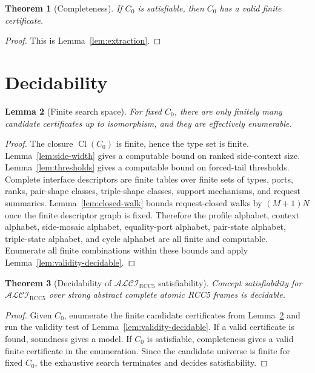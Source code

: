 \documentclass[11pt]{article}
\newtheorem{theorem}{Theorem}[section]
\newtheorem{lemma}[theorem]{Lemma}
\newcommand{\Logic}{\mathcal{ALCI}_{\mathrm{RCC5}}}
\newcommand{\Cl}{\operatorname{Cl}}
\begin{document}
\begin{theorem}[Completeness]
If $C_0$ is satisfiable, then $C_0$ has a valid finite certificate.
\end{theorem}

\begin{proof}
This is Lemma~\ref{lem:extraction}.
\end{proof}


\section{Decidability}

\begin{lemma}[Finite search space]\label{lem:finite-universe}
For fixed $C_0$, there are only finitely many candidate certificates up to isomorphism, and they are effectively enumerable.
\end{lemma}

\begin{proof}
The closure $\Cl(C_0)$ is finite, hence the type set is finite.  Lemma~\ref{lem:side-width} gives a computable bound on ranked side-context size.  Lemma~\ref{lem:thresholds} gives a computable bound on forced-tail thresholds.  Complete interface descriptors are finite tables over finite sets of types, ports, ranks, pair-shape classes, triple-shape classes, support mechanisms, and request summaries.  Lemma~\ref{lem:closed-walk} bounds request-closed walks by $(M+1)N$ once the finite descriptor graph is fixed.  Therefore the profile alphabet, context alphabet, side-mosaic alphabet, equality-port alphabet, pair-state alphabet, triple-state alphabet, and cycle alphabet are all finite and computable.  Enumerate all finite combinations within these bounds and apply Lemma~\ref{lem:validity-decidable}.
\end{proof}

\begin{theorem}[Decidability of $\Logic$ satisfiability]\label{thm:decidability}
Concept satisfiability for $\Logic$ over strong abstract complete atomic RCC5 frames is decidable.
\end{theorem}

\begin{proof}
Given $C_0$, enumerate the finite candidate certificates from Lemma~\ref{lem:finite-universe} and run the validity test of Lemma~\ref{lem:validity-decidable}.  If a valid certificate is found, soundness gives a model.  If $C_0$ is satisfiable, completeness gives a valid finite certificate in the enumeration.  Since the candidate universe is finite for fixed $C_0$, the exhaustive search terminates and decides satisfiability.
\end{proof}
\end{document}
